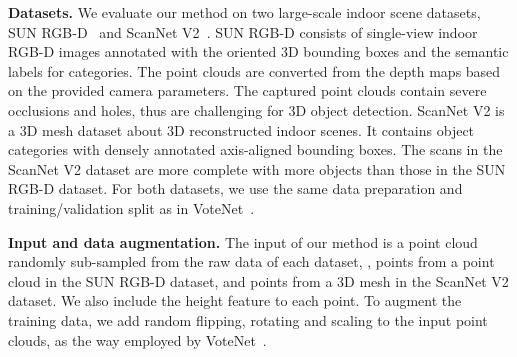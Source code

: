 \documentclass[final]{cvpr}
\begin{document}
\noindent\textbf{Datasets.} We evaluate our method on two large-scale indoor scene datasets, \ie SUN RGB-D~\cite{sunrgb-d} and ScanNet V2~\cite{scannet}.
SUN RGB-D consists of  single-view indoor RGB-D images annotated with the oriented 3D bounding boxes and the semantic labels for  categories.
The point clouds are converted from the depth maps based on the provided camera parameters.
The captured point clouds contain severe occlusions and holes, thus are challenging for 3D object detection.
ScanNet V2 is a 3D mesh dataset about  3D reconstructed indoor scenes.
It contains  object categories with densely annotated axis-aligned bounding boxes.
The scans in the ScanNet V2 dataset are more complete with more objects than those in the SUN RGB-D dataset.
For both datasets, we use the same data preparation and training/validation split as in VoteNet~\cite{votenet}.

\vspace{+1mm}
\noindent\textbf{Input and data augmentation.} The input of our method is a point cloud randomly sub-sampled from the raw data of each dataset, \ie,  points from a point cloud in the SUN RGB-D dataset, and  points from a 3D mesh in the ScanNet V2 dataset.
We also include the height feature to each point.
To augment the training data, we add random flipping, rotating and scaling to the input point clouds, as the way employed by VoteNet~\cite{votenet}.
\end{document}

